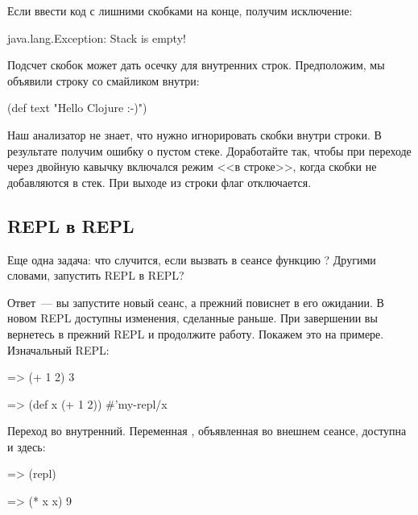 Если ввести код с лишними скобками на конце, получим исключение:

\begin{english}
  \begin{text}
java.lang.Exception: Stack is empty!
  \end{text}
\end{english}

Подсчет скобок может дать осечку для внутренних строк. Предположим, мы объявили строку со смайликом внутри:

\begin{english}
  \begin{clojure}
(def text "Hello Clojure :-)")
  \end{clojure}
\end{english}

Наш анализатор не знает, что нужно игнорировать скобки внутри строки. В результате получим ошибку о пустом стеке. Доработайте  так, чтобы при переходе через двойную кавычку включался режим <<в строке>>, когда скобки не добавляются в стек. При выходе из строки флаг отключается.

\subsection{REPL в REPL}

Еще одна задача: что случится, если вызвать в сеансе функцию ? Другими словами, запустить REPL в REPL?

Ответ~--- вы запустите новый сеанс, а прежний повиснет в его ожидании. В новом REPL доступны изменения, сделанные раньше. При завершении вы вернетесь в прежний REPL и продолжите работу. Покажем это на примере. Изначальный REPL:

\begin{english}
  \begin{clojure/lines}
=> (+ 1 2)
3

=> (def x (+ 1 2))
#'my-repl/x
  \end{clojure/lines}
\end{english}

\pagebreaklarge

Переход во внутренний. Переменная , объявленная во внешнем сеансе, доступна и здесь:

\begin{english}
  \begin{clojure}
=> (repl)

=> (* x x)
9
  \end{clojure}
\end{english}

